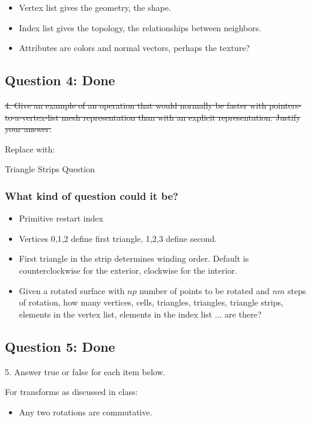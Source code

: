 \documentclass[11pt]{article}
\begin{document}
\begin{spacing}{1.2}
\begin{itemize}
	\item Vertex list gives the geometry, the shape.  
	\item Index list gives the topology, the relationships between neighbors.  
	\item Attributes are colors and normal vectors, perhaps the texture?
\end{itemize}

\subsection{Question 4:  Done}

\sout{4.  Give an example of an operation that would normally be faster with pointers-to-a-vertex-list mesh representation than with an explicit representation.  Justify your answer.  }

Replace with:

Triangle Strips Question

\subsubsection{What kind of question could it be?}

\begin{itemize}
	\item Primitive restart index
	\item Vertices 0,1,2 define first triangle, 1,2,3 define second. 
	\item First triangle in the strip determines winding order.  Default is counterclockwise for the exterior, clockwise for the interior.  
	\item Given a rotated surface with $np$ number of points to be rotated and $nm$ steps of rotation, how many vertices, cells, triangles, triangles, triangle strips, elements in the vertex list, elements in the index list ... are there?
\end{itemize}


\subsection{Question 5:  Done}
5.  Answer true or false for each item below.  

For transforms as discussed in class:

\begin{itemize}
	\item Any two rotations are commutative.
	

\end{itemize}
\end{spacing}
\end{document}
